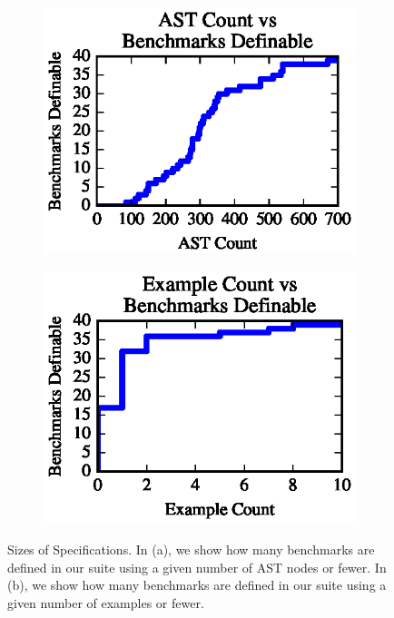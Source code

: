 \documentclass[sigplan,acmsmall]{acmart}
\begin{document}
\begin{figure}
  \centering
  \begin{subfigure}[b]{.49\textwidth}
    \centering
    \includegraphics{generated-graphs/specsizes}
    \caption{}
    \label{subfig:lenssize}
  \end{subfigure}
  \begin{subfigure}[b]{.49\textwidth}
    \includegraphics{generated-graphs/examplesused}
    \caption{}
    \label{subfig:examplesused}
  \end{subfigure}
  \caption{Sizes of Specifications.
    In (a), we show how many benchmarks are defined in our suite using a
    given number of AST nodes or fewer.
    In (b), we show how many benchmarks are defined in our suite using a
    given number of examples or fewer.}
  \label{fig:definition-sizes}
\end{figure}
\end{document}
